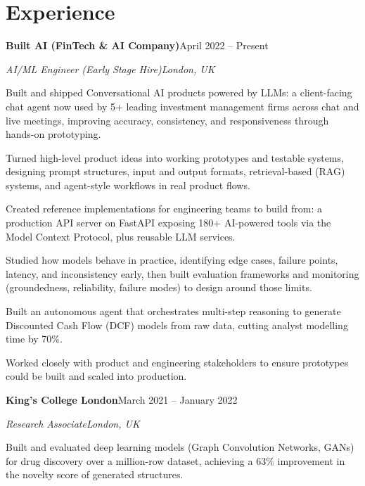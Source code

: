 \documentclass[10pt,a4paper]{article}
\newcommand{\entry}[4]{%
  {\color{company}\bfseries #1}\hfill {\color{muted}#2}\par
  \vspace{1pt}
  {\itshape #3}\hfill {\color{muted}\itshape #4}\par
  \vspace{3pt}%
}
\begin{document}
\section{Experience}
\entry{Built AI (FinTech \& AI Company)}{April 2022 -- Present}{AI/ML Engineer (Early Stage Hire)}{London, UK}
\begin{tight}
  \item Built and shipped Conversational AI products powered by LLMs: a client-facing chat agent now used by 5+ leading investment management firms across chat and live meetings, improving accuracy, consistency, and responsiveness through hands-on prototyping.
  \item Turned high-level product ideas into working prototypes and testable systems, designing prompt structures, input and output formats, retrieval-based (RAG) systems, and agent-style workflows in real product flows.
  \item Created reference implementations for engineering teams to build from: a production API server on FastAPI exposing 180+ AI-powered tools via the Model Context Protocol, plus reusable LLM services.
  \item Studied how models behave in practice, identifying edge cases, failure points, latency, and inconsistency early, then built evaluation frameworks and monitoring (groundedness, reliability, failure modes) to design around those limits.
  \item Built an autonomous agent that orchestrates multi-step reasoning to generate Discounted Cash Flow (DCF) models from raw data, cutting analyst modelling time by 70\%.
  \item Worked closely with product and engineering stakeholders to ensure prototypes could be built and scaled into production.
\end{tight}

\entry{King's College London}{March 2021 -- January 2022}{Research Associate}{London, UK}
\begin{tight}
  \item Built and evaluated deep learning models (Graph Convolution Networks, GANs) for drug discovery over a million-row dataset, achieving a 63\% improvement in the novelty score of generated structures.
\end{tight}

\end{document}
